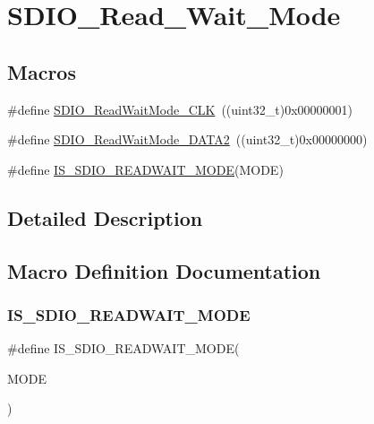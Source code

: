 \hypertarget{group___s_d_i_o___read___wait___mode}{}\section{S\+D\+I\+O\+\_\+\+Read\+\_\+\+Wait\+\_\+\+Mode}
\label{group___s_d_i_o___read___wait___mode}
\subsection*{Macros}
\begin{DoxyCompactItemize}
\item 
\#define \mbox{\hyperlink{group___s_d_i_o___read___wait___mode_ga5d73b50fed8b2589f337a6301f22f41c}{S\+D\+I\+O\+\_\+\+Read\+Wait\+Mode\+\_\+\+C\+LK}}~((uint32\+\_\+t)0x00000001)
\item 
\#define \mbox{\hyperlink{group___s_d_i_o___read___wait___mode_ga3d6952d82468b49dcc7abd5b9e02039f}{S\+D\+I\+O\+\_\+\+Read\+Wait\+Mode\+\_\+\+D\+A\+T\+A2}}~((uint32\+\_\+t)0x00000000)
\item 
\#define \mbox{\hyperlink{group___s_d_i_o___read___wait___mode_ga35144093f5b3553a62c2248896eead4d}{I\+S\+\_\+\+S\+D\+I\+O\+\_\+\+R\+E\+A\+D\+W\+A\+I\+T\+\_\+\+M\+O\+DE}}(M\+O\+DE)
\end{DoxyCompactItemize}


\subsection{Detailed Description}


\subsection{Macro Definition Documentation}
\mbox{\label{group___s_d_i_o___read___wait___mode_ga35144093f5b3553a62c2248896eead4d}} 
\subsubsection{\texorpdfstring{IS\_SDIO\_READWAIT\_MODE}{IS\_SDIO\_READWAIT\_MODE}}
{\footnotesize\ttfamily \#define I\+S\+\_\+\+S\+D\+I\+O\+\_\+\+R\+E\+A\+D\+W\+A\+I\+T\+\_\+\+M\+O\+DE(\begin{DoxyParamCaption}\item[{}]{M\+O\+DE }\end{DoxyParamCaption})}

